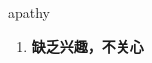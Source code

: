 
\begin{frame}
{\huge apathy}
\begin{center}
\begin{enumerate}\Large
  \item \textbf{缺乏兴趣，不关心}
\end{enumerate}
\end{center}
\end{frame}
